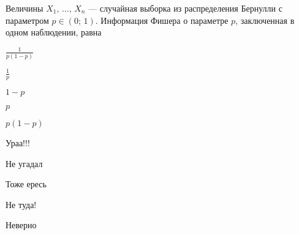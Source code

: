 
\begin{question}
Величины \(X_1, \, \ldots, \, X_n\) --- случайная выборка из
распределения Бернулли с параметром \(p \in (0;\,1)\). Информация Фишера
о параметре \(p\), заключенная в одном наблюдении, равна
\begin{answerlist}
  \item \(\frac{1}{p(1-p)}\)
  \item \(\frac{1}{p}\)
  \item \(1 - p\)
  \item \(p\)
  \item \(p(1-p)\)
\end{answerlist}
\end{question}

\begin{solution}
\begin{answerlist}
  \item Ураа!!!
  \item Не угадал
  \item Тоже ересь
  \item Не туда!
  \item Неверно
\end{answerlist}
\end{solution}

